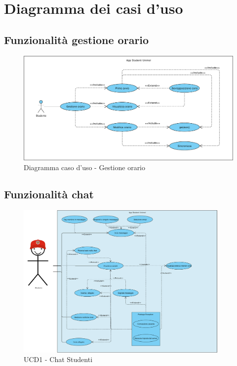 \section{Diagramma dei casi d'uso}
\pagebreak
\subsection{Funzionalità gestione orario}

\begin{figure}[H]
	\centering
	\includegraphics[width=\textwidth]{imgs/gruppo2/usecase-diagram-orario.pdf}
	\caption{Diagramma caso d'uso - Gestione orario}
	\label{fig:diag-caso-duso-gestione-orario}
\end{figure}

\subsection{Funzionalità chat}

\begin{figure}[H]
	\centering
	\includegraphics[height=3in]{imgs/gruppo6/use_case_diagrams/ucd1_chat_studenti.pdf}
	\caption{UCD1 - Chat Studenti}
	\label{fig:ucd1-stud}
\end{figure}

